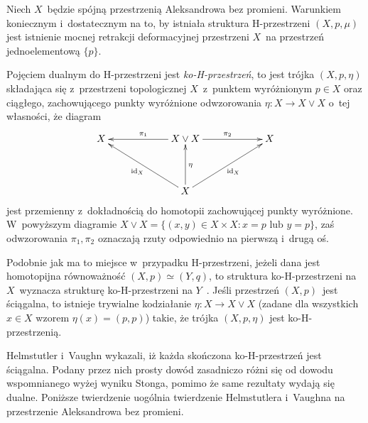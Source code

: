 \begin{stw}\label{stw-stonga_o_h_przestrzeniach}
Niech $X$~będzie spójną przestrzenią Aleksandrowa bez promieni. Warunkiem koniecznym i~dostatecznym na to, by istniała struktura H-przestrzeni $(X,p,\mu)$ jest istnienie mocnej retrakcji deformacyjnej przestrzeni $X$~na przestrzeń jednoelementową $\{p\}$.
\end{stw}

Pojęciem dualnym do H-przestrzeni jest \textit{ko-H-przestrzeń}, to jest trójka $(X,p,\eta)$ składająca się z~przestrzeni topologicznej $X$~z~punktem wyróżnionym $p\in X$ oraz ciągłego, zachowującego punkty wyróżnione odwzorowania $\eta\colon X\to X\vee X$ o~tej własności, 
że diagram
\[\xymatrix@C=60pt@R=40pt{X\ar@{<-}[dr]_{\id_X} & X\vee X\ar[l]_{\pi_1}\ar[r]^{\pi_2}\ar@{<-}[d]^{\eta} & X\ar@{<-}[dl]^{\id_X} \\ & X}\]
jest przemienny z~dokładnością do homotopii zachowującej punkty wyróżnione. W~powyższym diagramie $X\vee X=\{(x,y)\in X\times X: x=p \text{ lub } y=p\}$, zaś odwzorowania $\pi_1,\pi_2$ oznaczają rzuty odpowiednio na pierwszą i~drugą oś.

Podobnie jak ma to miejsce w~przypadku H-przestrzeni, jeżeli dana jest homotopijna równoważność $(X,p)\simeq (Y,q)$, to struktura ko-H-przestrzeni na $X$~wyznacza strukturę ko-H-przestrzeni na $Y$~\cite[Theorem 1.6.1]{Spanier81}. Jeśli przestrzeń $(X,p)$~jest ściągalna, to istnieje trywialne kodziałanie $\eta:X\to X\vee X$ (zadane dla wszystkich $x\in X$ wzorem $\eta(x)=(p, p)$) takie, że trójka $(X,p,\eta)$ jest \mbox{ko-H-przestrzenią}.

Helmstutler i~Vaughn \cite{Helmstutler10} wykazali, iż każda skończona ko-H-przestrzeń jest ściągalna. Podany przez nich prosty dowód zasadniczo różni się od dowodu wspomnianego wyżej wyniku Stonga, pomimo że same rezultaty wydają się dualne. Poniższe twierdzenie uogólnia twierdzenie Helmstutlera i~Vaughna na przestrzenie Aleksandrowa bez promieni.


